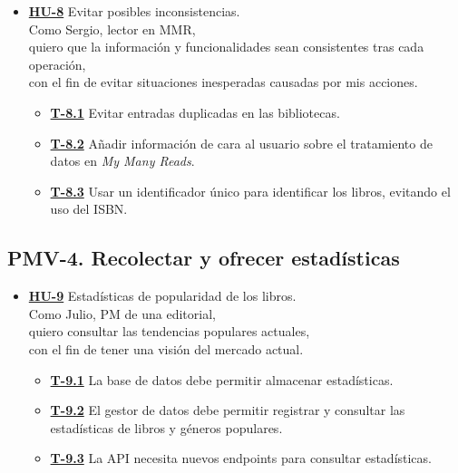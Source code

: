 \begin{itemize}
\begin{itemize}
    \end{itemize}
    \item \href{https://github.com/Anglepi/My-Many-Reads/issues/98}{\textbf{HU-8}} Evitar posibles inconsistencias. \\
    Como Sergio, lector en MMR, \\
    quiero que la información y funcionalidades sean consistentes tras cada operación, \\
    con el fin de evitar situaciones inesperadas causadas por mis acciones.
    \begin{itemize}
        \item \href{https://github.com/Anglepi/My-Many-Reads/issues/93}{\textbf{T-8.1}} Evitar entradas duplicadas en las bibliotecas.
        \item \href{https://github.com/Anglepi/My-Many-Reads/issues/94}{\textbf{T-8.2}} Añadir información de cara al usuario sobre el tratamiento de datos en \textit{My Many Reads}.
        \item \href{https://github.com/Anglepi/My-Many-Reads/issues/96}{\textbf{T-8.3}} Usar un identificador único para identificar los libros, evitando el uso del ISBN.
    \end{itemize}
\end{itemize}

\subsection{PMV-4. Recolectar y ofrecer estadísticas}

\begin{itemize}
    \item \href{https://github.com/Anglepi/My-Many-Reads/issues/116}{\textbf{HU-9}} Estadísticas de popularidad de los libros.  \\
    Como Julio, PM de una editorial, \\
    quiero consultar las tendencias populares actuales, \\
    con el fin de tener una visión del mercado actual.
    \begin{itemize}
        \item \href{https://github.com/Anglepi/My-Many-Reads/issues/117}{\textbf{T-9.1}} La base de datos debe permitir almacenar estadísticas.
        \item \href{https://github.com/Anglepi/My-Many-Reads/issues/118}{\textbf{T-9.2}} El gestor de datos debe permitir registrar y consultar las estadísticas de libros y géneros populares.
        \item \href{https://github.com/Anglepi/My-Many-Reads/issues/119}{\textbf{T-9.3}} La API necesita nuevos endpoints para consultar estadísticas.
    \end{itemize}
\end{itemize}